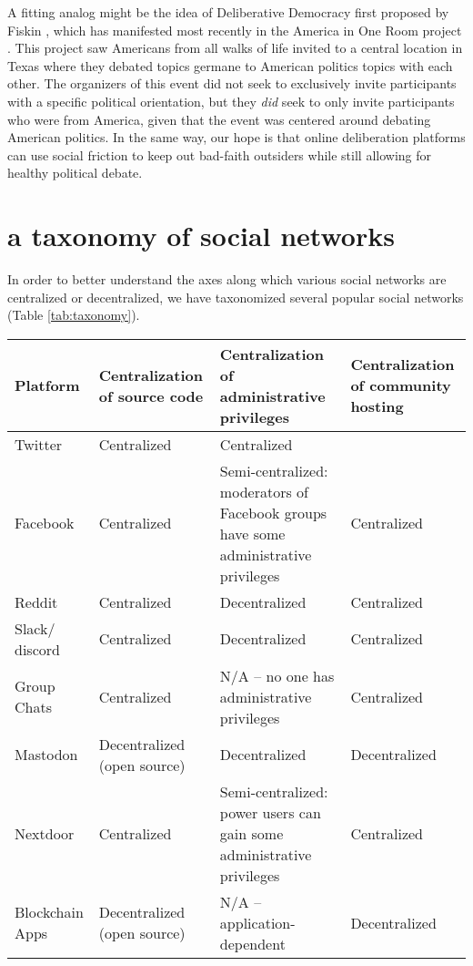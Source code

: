 \documentclass[sigconf,authordraft]{acmart}
\begin{document}
A fitting analog might be the idea of Deliberative Democracy first proposed by Fiskin \cite{fishkin1991democracy}, which has manifested most recently in the America in One Room project \cite{AmericaInOneRoom}. This project saw Americans from all walks of life invited to a central location in Texas where they debated topics germane to American politics topics with each other. The organizers of this event did not seek to exclusively invite participants with a specific political orientation, but they {\itshape did} seek to only invite participants who were from America, given that the event was centered around debating American politics. In the same way, our hope is that online deliberation platforms can use social friction to keep out bad-faith outsiders while still allowing for healthy political debate.

\section{a taxonomy of social networks}

In order to better understand the axes along which various social networks are centralized or decentralized, we have taxonomized several popular social networks  (Table \ref{tab:taxonomy}).


\begin{table*}
  \caption{A taxonomy of online networks}
  \label{tab:taxonomy}
  \begin{tabularx}{\textwidth}{llXX}
    \toprule
    Platform & Centralization of source code & Centralization of administrative privileges & Centralization of community hosting \\
    \midrule
    Twitter  & Centralized & Centralized\\
    Facebook & Centralized & Semi-centralized: moderators of Facebook groups have some administrative privileges & Centralized\\
    Reddit   & Centralized & Decentralized & Centralized  \\
    Slack/ discord & Centralized & Decentralized & Centralized \\
    Group Chats & Centralized & N/A -- no one has administrative privileges & Centralized \\
    Mastodon & Decentralized (open source) & Decentralized & Decentralized\\
    Nextdoor & Centralized & Semi-centralized: power users can gain some administrative privileges & Centralized \\
    Blockchain Apps & Decentralized (open source) & N/A -- application-dependent & Decentralized\\
    \bottomrule
  \end{tabularx}
\end{table*}
\end{document}
